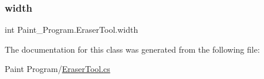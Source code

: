 \subsubsection{\texorpdfstring{width}{width}}
{\footnotesize\ttfamily int Paint\+\_\+\+Program.\+Eraser\+Tool.\+width\hspace{0.3cm}{\ttfamily [private]}}



The documentation for this class was generated from the following file\+:\begin{DoxyCompactItemize}
\item 
Paint Program/\mbox{\hyperlink{_eraser_tool_8cs}{Eraser\+Tool.\+cs}}\end{DoxyCompactItemize}
